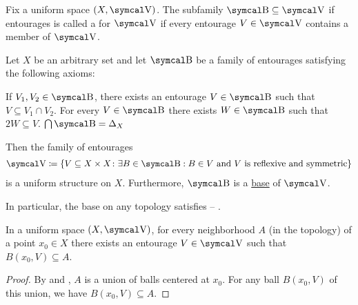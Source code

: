 \begin{definition}\label{def:uniform_space_base}
  Fix a uniform space \( (X, \CV) \). The subfamily \( \CB \subseteq \CV \) if entourages is called a  for \( \CV \) if every entourage \( V \in \CV \) contains a member of \( \CV \).
\end{definition}

\begin{definition}\label{thm:uniform_space_base_axioms}
  Let \( X \) be an arbitrary set and let \( \CB \) be a family of entourages satisfying the following axioms:
  \begin{DefEnum}
     If \( V_1, V_2 \in \CB \), there exists an entourage \( V \in \CB \) such that \( V \subseteq V_1 \cap V_2 \).
     For every \( V \in \CB \) there exists \( W \in \CB \) such that \( 2W \subseteq V \).
     \( \bigcap \CB = \Delta_X \)
  \end{DefEnum}

  Then the family of entourages
  \begin{align}\label{thm:uniform_space_base_axioms/uniformity}
    \CV \coloneqq \left\{ V \subseteq X \times X \colon \exists B \in \CB: B \in V \Tand V \text{ is reflexive and symmetric} \right\}
  \end{align}
  is a uniform structure on \( X \). Furthermore, \( \CB \) is a \hyperref[def:uniform_space_base]{base} of \( \CV \).

  In particular, the base on any topology satisfies  -- .
\end{definition}

\begin{lemma}\label{thm:uniform_space_neighborhood_contains_ball}
  In a uniform space \( (X, \CV) \), for every neighborhood \( A \) (in the topology) of a point \( x_0 \in X \) there exists an entourage \( V \in \CV \) such that \( B(x_0, V) \subseteq A \).
\end{lemma}
\begin{proof}
  By  and , \( A \) is a union of balls centered at \( x_0 \). For any ball \( B(x_0, V) \) of this union, we have \( B(x_0, V) \subseteq A \).
\end{proof}

